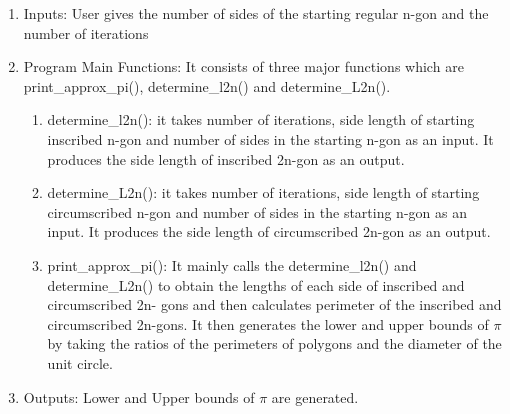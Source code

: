 \documentclass[12pt]{article}
\begin{document}
\begin{enumerate}
\item Inputs: User gives the number of sides of the starting regular n-gon and
the number of iterations
\item Program Main Functions: It consists of three major functions which are
print\_approx\_pi(), determine\_l2n() and determine\_L2n().
\begin{enumerate}
\item determine\_l2n(): it takes number of iterations, side length of starting
inscribed n-gon and number of sides in the starting n-gon as an input. It produces
the side length of inscribed 2n-gon as an output.
\item determine\_L2n(): it takes number of iterations, side length of starting
circumscribed n-gon and number of sides in the starting n-gon as an input. It produces the
side length of circumscribed 2n-gon as an output.
\item print\_approx\_pi(): It mainly calls the determine\_l2n() and determine\_L2n()
to obtain the lengths of each side of inscribed and circumscribed 2n-
gons and then calculates perimeter of the inscribed and circumscribed 2n-gons. It then generates the lower and upper bounds of $\pi$ by taking the ratios of the perimeters of polygons and the diameter of the unit circle.
\end{enumerate}
\item Outputs: Lower and Upper bounds of $\pi$ are generated.
\end{enumerate}

\iffalse
\section {RESULTS}
we can represent the results in the form of a table, or graph, etc.

Graph (approx value vs number of sides) representing the result of each iteration would be a better way to represent the results in this project.


\section {ANALYSIS}
answer any questions which were initially posed, give the reader a deeper understanding of the topic.


\section {CONCLUSION}
summarize findings, acknowledge potential future research, indicate any results which could not be obtained.


\section {REFERENCES}
Cite the following:\\
--pythagorean theorem\\


\section {APPENDICES}
includes computer code, any other related info which is not strongly related but you want the reader to have access to. Number them in a different notation from sections.
\fi
\end{document}
